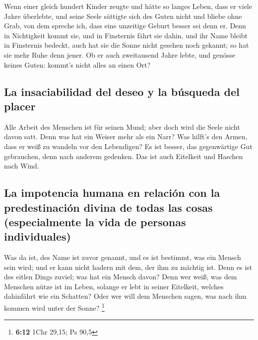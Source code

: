  Wenn einer gleich hundert Kinder zeugte und hätte so
langes Leben, dass er viele Jahre überlebte, und seine Seele sättigte
sich des Guten nicht und bliebe ohne Grab, von dem spreche ich, dass
eine unzeitige Geburt besser sei denn er.  Denn in
Nichtigkeit kommt sie, und in Finsternis fährt sie dahin, und ihr Name
bleibt in Finsternis bedeckt,  auch hat sie die Sonne
nicht gesehen noch gekannt; so hat sie mehr Ruhe denn jener.
 Ob er auch zweitausend Jahre lebte, und genösse keines
Guten: kommt's nicht alles an einen Ort?

\hypertarget{la-insaciabilidad-del-deseo-y-la-buxfasqueda-del-placer}{%
\subsection{La insaciabilidad del deseo y la búsqueda del
placer}\label{la-insaciabilidad-del-deseo-y-la-buxfasqueda-del-placer}}

 Alle Arbeit des Menschen ist für seinen Mund; aber doch
wird die Seele nicht davon satt.  Denn was hat ein Weiser
mehr als ein Narr? Was hilft's den Armen, dass er weiß zu wandeln vor
den Lebendigen?  Es ist besser, das gegenwärtige Gut
gebrauchen, denn nach anderem gedenken. Das ist auch Eitelkeit und
Haschen nach Wind.

\hypertarget{la-impotencia-humana-en-relaciuxf3n-con-la-predestinaciuxf3n-divina-de-todas-las-cosas-especialmente-la-vida-de-personas-individuales}{%
\subsection{La impotencia humana en relación con la predestinación
divina de todas las cosas (especialmente la vida de personas
individuales)}\label{la-impotencia-humana-en-relaciuxf3n-con-la-predestinaciuxf3n-divina-de-todas-las-cosas-especialmente-la-vida-de-personas-individuales}}

 Was da ist, des Name ist zuvor genannt, und es ist
bestimmt, was ein Mensch sein wird; und er kann nicht hadern mit dem,
der ihm zu mächtig ist.  Denn es ist des eitlen Dings
zuviel; was hat ein Mensch davon?  Denn wer weiß, was dem
Menschen nütze ist im Leben, solange er lebt in seiner Eitelkeit,
welches dahinfährt wie ein Schatten? Oder wer will dem Menschen sagen,
was nach ihm kommen wird unter der Sonne? \footnote{\textbf{6:12} 1Chr
  29,15; Ps 90,5}

